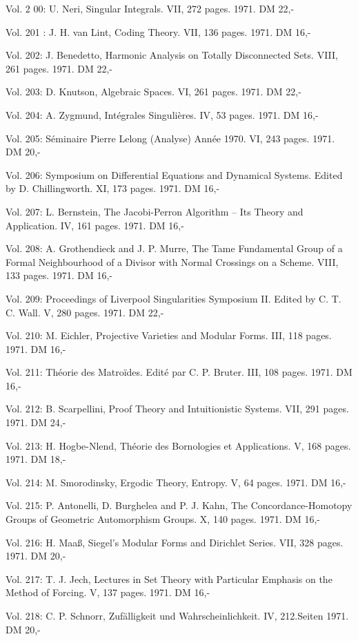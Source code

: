 Vol. 2 00: U. Neri, Singular Integrals. VII, 272 pages. 1971. DM 22,-

Vol. 201 : J. H. van Lint, Coding Theory. VII, 136 pages. 1971. DM 16,-

Vol. 202: J. Benedetto, Harmonic Analysis on Totally Disconnected Sets. VIII, 261 pages. 1971. DM 22,-

Vol. 203: D. Knutson, Algebraic Spaces. VI, 261 pages. 1971. DM 22,-

Vol. 204: A. Zygmund, Intégrales Singulières. IV, 53 pages. 1971. DM 16,-

Vol. 205: Séminaire Pierre Lelong (Analyse) Année 1970. VI, 243 pages. 1971. DM 20,-

Vol. 206: Symposium on Differential Equations and Dynamical Systems. Edited by D. Chillingworth. XI, 173 pages. 1971. DM 16,-

Vol. 207: L. Bernstein, The Jacobi-Perron Algorithm -- Its Theory and Application. IV, 161 pages. 1971. DM 16,-

Vol. 208: A. Grothendieck and J. P. Murre, The Tame Fundamental Group of a Formal Neighbourhood of a Divisor with Normal Crossings on a Scheme. VIII, 133 pages. 1971. DM 16,-

Vol. 209: Proceedings of Liverpool Singularities \quad Symposium II. Edited by C. T. C. Wall. V, 280 pages. 1971. DM 22,-

Vol. 210: M. Eichler, Projective Varieties and Modular Forms. III, 118 pages. 1971. DM 16,-

Vol. 211: Théorie des Matroïdes. Edité par C. P. Bruter. III, 108 pages. 1971. DM 16,-

Vol. 212: B. Scarpellini, Proof Theory and Intuitionistic Systems. VII, 291 pages. 1971. DM 24,-

Vol. 213: H. Hogbe-Nlend, Théorie des Bornologies et Applications. V, 168 pages. 1971. DM 18,-

Vol. 214: M. Smorodinsky, Ergodic Theory, Entropy. V, 64 pages. 1971. DM 16,-

Vol. 215: P. Antonelli, D. Burghelea and P. J. Kahn, The Concordance-Homotopy Groups of Geometric Automorphism Groups. X, 140 pages. 1971. DM 16,-

Vol. 216: H. Maaß, Siegel's Modular Forms and Dirichlet Series. VII, 328 pages. 1971. DM 20,-

Vol. 217: T. J. Jech, Lectures in Set Theory with Particular Emphasis on the Method of Forcing. V, 137 pages. 1971. DM 16,-

Vol. 218: C. P. Schnorr, Zufälligkeit und Wahrscheinlichkeit. IV, 212.Seiten 1971. DM 20,-

